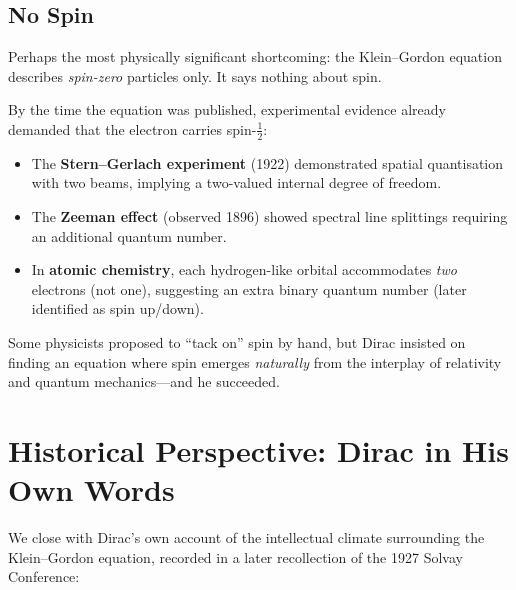 \documentclass[12pt, a4paper]{article}
\theoremstyle{definition}
\begin{document}
\subsection{No Spin}

Perhaps the most physically significant shortcoming: the Klein--Gordon
equation describes \emph{spin-zero} particles only.  It says nothing about
spin.

By the time the equation was published, experimental evidence already
demanded that the electron carries spin-$\tfrac{1}{2}$:
\begin{itemize}
    \item The \textbf{Stern--Gerlach experiment} (1922) demonstrated spatial
          quantisation with two beams, implying a two-valued internal degree
          of freedom.
    \item The \textbf{Zeeman effect} (observed 1896) showed spectral line
          splittings requiring an additional quantum number.
    \item In \textbf{atomic chemistry}, each hydrogen-like orbital
          accommodates \emph{two} electrons (not one), suggesting an extra
          binary quantum number (later identified as spin up/down).
\end{itemize}

Some physicists proposed to ``tack on'' spin by hand, but Dirac insisted on
finding an equation where spin emerges \emph{naturally} from the interplay
of relativity and quantum mechanics---and he succeeded.

\section{Historical Perspective: Dirac in His Own Words}
\label{sec:dirac}

We close with Dirac's own account of the intellectual climate surrounding the
Klein--Gordon equation, recorded in a later recollection of the 1927 Solvay
Conference:
\end{document}
